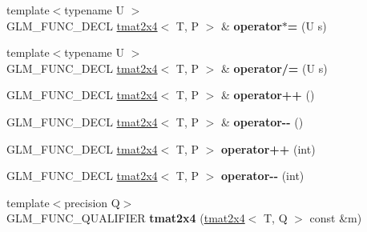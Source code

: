 \begin{DoxyCompactItemize}
\item 
{\footnotesize template$<$typename U $>$ }\\G\+L\+M\+\_\+\+F\+U\+N\+C\+\_\+\+D\+E\+CL \hyperlink{structglm_1_1detail_1_1tmat2x4}{tmat2x4}$<$ T, P $>$ \& {\bfseries operator$\ast$=} (U s)\hypertarget{structglm_1_1detail_1_1tmat2x4_af29fd96e82abe8f85ac318865d365755}{}\label{structglm_1_1detail_1_1tmat2x4_af29fd96e82abe8f85ac318865d365755}

\item 
{\footnotesize template$<$typename U $>$ }\\G\+L\+M\+\_\+\+F\+U\+N\+C\+\_\+\+D\+E\+CL \hyperlink{structglm_1_1detail_1_1tmat2x4}{tmat2x4}$<$ T, P $>$ \& {\bfseries operator/=} (U s)\hypertarget{structglm_1_1detail_1_1tmat2x4_a02241268cd53f9e9eee1a0e3deae6856}{}\label{structglm_1_1detail_1_1tmat2x4_a02241268cd53f9e9eee1a0e3deae6856}

\item 
G\+L\+M\+\_\+\+F\+U\+N\+C\+\_\+\+D\+E\+CL \hyperlink{structglm_1_1detail_1_1tmat2x4}{tmat2x4}$<$ T, P $>$ \& {\bfseries operator++} ()\hypertarget{structglm_1_1detail_1_1tmat2x4_ae3a31564490142cb6f43c1abb753b028}{}\label{structglm_1_1detail_1_1tmat2x4_ae3a31564490142cb6f43c1abb753b028}

\item 
G\+L\+M\+\_\+\+F\+U\+N\+C\+\_\+\+D\+E\+CL \hyperlink{structglm_1_1detail_1_1tmat2x4}{tmat2x4}$<$ T, P $>$ \& {\bfseries operator-\/-\/} ()\hypertarget{structglm_1_1detail_1_1tmat2x4_a556fd133fa224ffb3d2ebf13d727d820}{}\label{structglm_1_1detail_1_1tmat2x4_a556fd133fa224ffb3d2ebf13d727d820}

\item 
G\+L\+M\+\_\+\+F\+U\+N\+C\+\_\+\+D\+E\+CL \hyperlink{structglm_1_1detail_1_1tmat2x4}{tmat2x4}$<$ T, P $>$ {\bfseries operator++} (int)\hypertarget{structglm_1_1detail_1_1tmat2x4_a8917eda810b07dcf0a5e65e828724505}{}\label{structglm_1_1detail_1_1tmat2x4_a8917eda810b07dcf0a5e65e828724505}

\item 
G\+L\+M\+\_\+\+F\+U\+N\+C\+\_\+\+D\+E\+CL \hyperlink{structglm_1_1detail_1_1tmat2x4}{tmat2x4}$<$ T, P $>$ {\bfseries operator-\/-\/} (int)\hypertarget{structglm_1_1detail_1_1tmat2x4_a6cde4bc7178ddd37a9f8125f9f350ba0}{}\label{structglm_1_1detail_1_1tmat2x4_a6cde4bc7178ddd37a9f8125f9f350ba0}

\item 
{\footnotesize template$<$precision Q$>$ }\\G\+L\+M\+\_\+\+F\+U\+N\+C\+\_\+\+Q\+U\+A\+L\+I\+F\+I\+ER {\bfseries tmat2x4} (\hyperlink{structglm_1_1detail_1_1tmat2x4}{tmat2x4}$<$ T, Q $>$ const \&m)\hypertarget{structglm_1_1detail_1_1tmat2x4_ac1a53a7910b8085b462f623c70252f10}{}\label{structglm_1_1detail_1_1tmat2x4_ac1a53a7910b8085b462f623c70252f10}


\end{DoxyCompactItemize}
